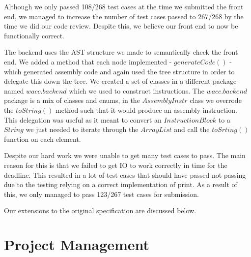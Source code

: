 \documentclass[a4paper, 11pt]{article} %
\begin{document}
Although we only passed 108/268 test cases at the time we submitted the front end, we managed to increase the number of test cases passed to 267/268 by the time we did our code review. Despite this, we believe our front end to now be functionally correct. 

The backend uses the AST structure we made to semantically check the front end. We added a method that each node implemented - $ generateCode() $ - which generated assembly code and again used the tree structure in order to delegate this down the tree. We created a set of classes in a different package named $ wacc.backend $ which we used to construct instructions. The $ wacc.backend $ package is a mix of classes and enums, in the $ AssemblyInstr $ class we overrode the $ toString() $ method such that it would produce an assembly instruction. This delegation was useful as it meant to convert an $ InstructionBlock $ to a $ String $ we just needed to iterate through the $ ArrayList $ and call the $ toSrting() $ function on each element.

Despite our hard work we were unable to get many test cases to pass. The main reason for this is that we failed to get IO to work correctly in time for the deadline. This resulted in a lot of test cases that should have passed not passing due to the testing relying on a correct implementation of print.
As a result of this, we only managed to pass 123/267 test cases for submission.

Our extensions to the original specification are discussed below.

\section*{Project Management}

\end{document}
